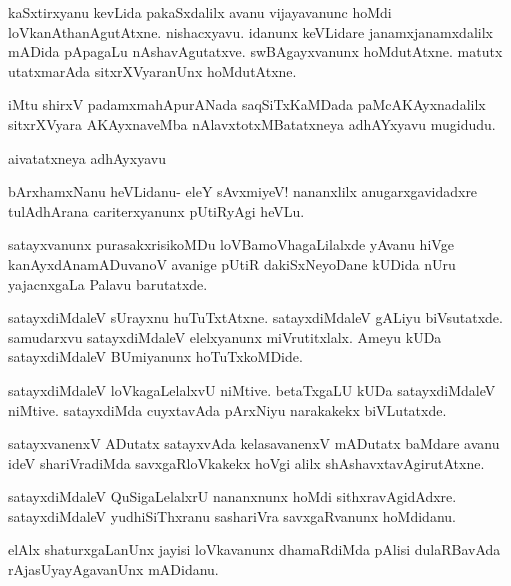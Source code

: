 \documentclass{article}
\begin{document}
\begin{mng}%
kaSxtirxyanu kevLida pakaSxdalilx avanu vijayavanunc hoMdi
loVkanAthanAgutAtxne. nishacxyavu. idanunx keVLidare janamxjanamxdalilx mADida
pApagaLu nAshavAgutatxve. swBAgayxvanunx hoMdutAtxne. matutx utatxmarAda
sitxrXVyaranUnx hoMdutAtxne.
\end{mng}

\begin{center}
iMtu shirxV padamxmahApurANada saqSiTxKaMDada paMcAKAyxnadalilx sitxrXVyara
AKAyxnaveMba nAlavxtotxMBatatxneya adhAYxyavu mugidudu.
\end{center}

\newpage
\begin{center}
{\textbf\large{aivatatxneya adhAyxyavu}}
\end{center}

\begin{mng}%
bArxhamxNanu heVLidanu- eleY sAvxmiyeV! nananxlilx anugarxgavidadxre
tulAdhArana cariterxyanunx pUtiRyAgi heVLu.
\end{mng}

\begin{mng}%
satayxvanunx purasakxrisikoMDu loVBamoVhagaLilalxde yAvanu
hiVge kanAyxdAnamADuvanoV avanige pUtiR dakiSxNeyoDane kUDida nUru
yajacnxgaLa Palavu barutatxde.
\end{mng}

\begin{mng}%
satayxdiMdaleV sUrayxnu huTuTxtAtxne. satayxdiMdaleV gALiyu
biVsutatxde. samudarxvu satayxdiMdaleV elelxyanunx miVrutitxlalx. Ameyu
kUDa satayxdiMdaleV BUmiyanunx hoTuTxkoMDide.
\end{mng}

\begin{mng}%
satayxdiMdaleV loVkagaLelalxvU niMtive. betaTxgaLU kUDa satayxdiMdaleV
niMtive. satayxdiMda cuyxtavAda pArxNiyu narakakekx biVLutatxde.
\end{mng}

\begin{mng}%
satayxvanenxV ADutatx satayxvAda kelasavanenxV mADutatx baMdare avanu
ideV shariVradiMda savxgaRloVkakekx hoVgi alilx shAshavxtavAgirutAtxne.
\end{mng}

\begin{mng}%
satayxdiMdaleV QuSigaLelalxrU nananxnunx hoMdi sithxravAgidAdxre.
satayxdiMdaleV yudhiSiThxranu sashariVra savxgaRvanunx hoMdidanu.
\end{mng}

\begin{mng}%
elAlx shaturxgaLanUnx jayisi loVkavanunx dhamaRdiMda pAlisi
dulaRBavAda rAjasUyayAgavanUnx mADidanu.
\end{mng}
\end{document}
